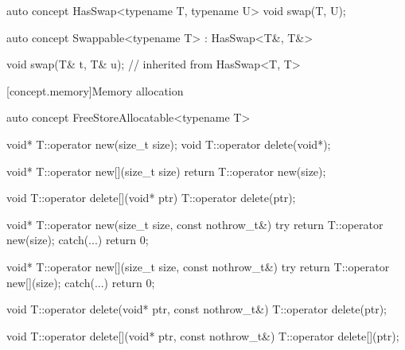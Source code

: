 \documentclass[american,twoside]{book}
\begin{document}
\begin{itemdecl}
auto concept HasSwap<typename T, typename U> {
  void swap(T, U);
}
\end{itemdecl}

\begin{itemdescr}
\pnum
{}
\end{itemdescr}

\begin{itemdecl}
auto concept Swappable<typename T> : HasSwap<T&, T&> { }
\end{itemdecl}

\begin{itemdescr}
\pnum
{}
\end{itemdescr}

\begin{itemdecl}
void swap(T& t, T& u); // inherited from HasSwap<T, T>
\end{itemdecl}

\begin{itemdescr}
\pnum
{}
\end{itemdescr}

[concept.memory]{Memory allocation}
\begin{itemdecl}
auto concept FreeStoreAllocatable<typename T> {
  void* T::operator new(size_t size);
  void T::operator delete(void*);

  void* T::operator new[](size_t size) {
    return T::operator new(size);
  }

  void T::operator delete[](void* ptr) {
    T::operator delete(ptr);
  }

  void* T::operator new(size_t size, const nothrow_t&) {
    try {
      return T::operator new(size);
    } catch(...) {
      return 0;
    }
  }

  void* T::operator new[](size_t size, const nothrow_t&) {
    try {
      return T::operator new[](size);
    } catch(...) {
      return 0;
    }
  }

  void T::operator delete(void* ptr, const nothrow_t&) {
    T::operator delete(ptr);
  }

  void T::operator delete[](void* ptr, const nothrow_t&) {
    T::operator delete[](ptr);
  }
}
\end{itemdecl}
\end{document}
